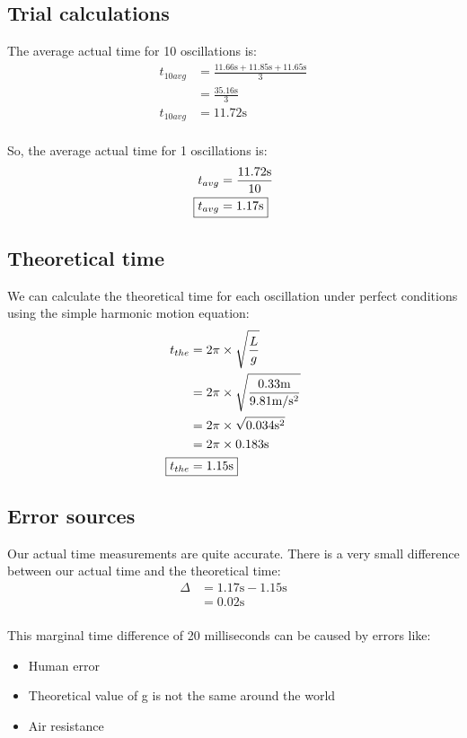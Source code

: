\documentclass[a4paper,12pt]{article}
\begin{document}
	\subsection{Trial calculations}
	The average actual time for 10 oscillations is:
	\begin{align*}
		t_{10avg}&=\frac{11.66\text{s}+11.85\text{s}+11.65\text{s}}{3}\\
		&=\frac{35.16\text{s}}{3} \\
		t_{10avg}&=11.72\text{s}\\
	\end{align*}
	
	So, the average actual time for 1 oscillations is:
	\begin{align*}
		t_{avg}&=\frac{11.72\text{s}}{10}\\
		\Aboxed{t_{avg}&=1.17\text{s}}
	\end{align*}
	
	\subsection{Theoretical time}
	We can calculate the theoretical time for each oscillation under perfect conditions using the simple harmonic motion equation:
	\begin{align*}
		t_{the}&=2\pi\times\sqrt{\frac{L}{g}}\\
		&=2\pi\times\sqrt{\frac{0.33\text{m}}{9.81\text{m}/\text{s}^2}}  \\
		&=2\pi\times\sqrt{0.034\text{s}^2}\\
		&=2\pi\times 0.183\text{s} \\
		\Aboxed{t_{the}&=1.15\text{s}}
	\end{align*} 
	
	\subsection{Error sources}
	Our actual time measurements are quite accurate. There is a very small difference between our actual time and the theoretical time:
	\begin{align*}
		\Delta&=1.17\text{s}-1.15\text{s} \\
		&=0.02\text{s}\\
	\end{align*}
	
	This marginal time difference of 20 milliseconds can be caused by errors like:
	\begin{itemize}
		\item Human error
		\item Theoretical value of g is not the same around the world
		\item Air resistance
	\end{itemize}
\end{document}
